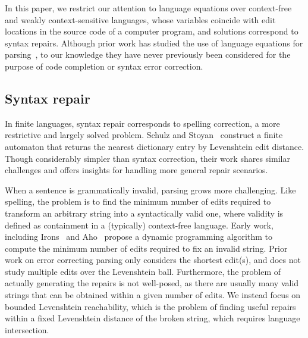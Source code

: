 \documentclass[sigplan,review,anonymous,acmsmall]{acmart}\settopmatter{printfolios=false,printccs=false,printacmref=false}
\begin{document}
  In this paper, we restrict our attention to language equations over context-free and weakly context-sensitive languages, whose variables coincide with edit locations in the source code of a computer program, and solutions correspond to syntax repairs. Although prior work has studied the use of language equations for parsing~\cite{might2011parsing}, to our knowledge they have never previously been considered for the purpose of code completion or syntax error correction.



  \subsection{Syntax repair}

  In finite languages, syntax repair corresponds to spelling correction, a more restrictive and largely solved problem. Schulz and Stoyan~\cite{schulz2002fast} construct a finite automaton that returns the nearest dictionary entry by Levenshtein edit distance. Though considerably simpler than syntax correction, their work shares similar challenges and offers insights for handling more general repair scenarios.

  When a sentence is grammatically invalid, parsing grows more challenging. Like spelling, the problem is to find the minimum number of edits required to transform an arbitrary string into a syntactically valid one, where validity is defined as containment in a (typically) context-free language. Early work, including Irons~\cite{irons1963error} and Aho~\cite{aho1972minimum} propose a dynamic programming algorithm to compute the minimum number of edits required to fix an invalid string. Prior work on error correcting parsing only considers the shortest edit(s), and does not study multiple edits over the Levenshtein ball. Furthermore, the problem of actually generating the repairs is not well-posed, as there are usually many valid strings that can be obtained within a given number of edits. We instead focus on bounded Levenshtein reachability, which is the problem of finding useful repairs within a fixed Levenshtein distance of the broken string, which requires language intersection.
\end{document}

